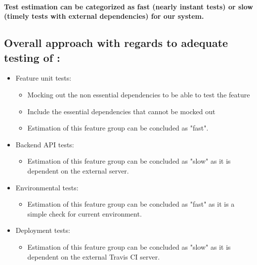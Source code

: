 \documentclass{article}
\begin{document}
\paragraph{Test estimation can be categorized as fast (nearly instant tests) or slow (timely tests with external dependencies) for our system.} 
\subsection{Overall approach with regards to adequate testing of :} 
\begin{itemize}
\item Feature unit tests:
\begin{itemize}
	\item Mocking out the non essential dependencies to be able to test the feature
	\item Include the essential dependencies that cannot be mocked out
	\item Estimation of this feature group can be concluded as "fast".
\end{itemize}
\item Backend API tests:
\begin{itemize}
	\item Estimation of this feature group can be concluded as "slow" as it is dependent on the external server.
\end{itemize}
\item Environmental tests:
\begin{itemize}
	\item Estimation of this feature group can be concluded as "fast" as it is a simple check for current environment.
\end{itemize}
\item Deployment tests:
\begin{itemize}
	\item Estimation of this feature group can be concluded as "slow" as it is dependent on the external Travis CI server.
\end{itemize}
\end{itemize}
\end{document}
